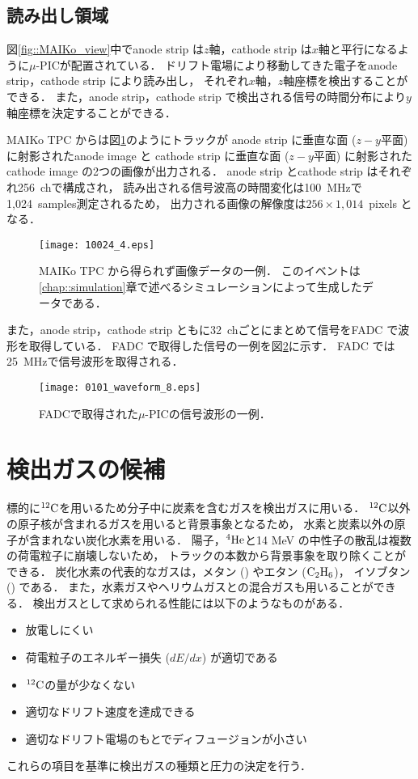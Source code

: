 \documentclass[../master]{subfiles}
\begin{document}
\subsection{読み出し領域}
\label{sec::mu-pic}
図\ref{fig::MAIKo_view}中でanode strip は$z$軸，cathode strip は$x$軸と平行になるように$\mu$-PICが配置されている．
ドリフト電場により移動してきた電子をanode strip，cathode strip により読み出し，
それぞれ$x$軸，$z$軸座標を検出することができる．
また，anode strip，cathode strip で検出される信号の時間分布により$y$軸座標を決定することができる．

MAIKo TPC からは図\ref{fig::track_demo}のようにトラックが
anode strip に垂直な面 ($z-y$平面) に射影されたanode image と
cathode strip に垂直な面 ($z-y$平面) に射影されたcathode image の2つの画像が出力される．
anode strip とcathode strip はそれぞれ256~chで構成され，
読み出される信号波高の時間変化は\SI{100}{\mega\hertz}で1,024~samples測定されるため，
出力される画像の解像度は$256\times1,014$~pixels となる．
\begin{figure}
  \centering
  \texttt{[image: 10024\_4.eps]}
  \caption[MAIKo TPC から得られず画像データの一例．]
          {MAIKo TPC から得られず画像データの一例．
          このイベントは\ref{chap::simulation}章で述べるシミュレーションによって生成したデータである．}
  \label{fig::track_demo}
\end{figure}
また，anode strip，cathode strip ともに32~chごとにまとめて信号をFADC で波形を取得している．
FADC で取得した信号の一例を図\ref{fig::FADC_waveform}に示す．
FADC では\SI{25}{\mega\hertz}で信号波形を取得される．
\begin{figure}
  \centering
  \texttt{[image: 0101\_waveform\_8.eps]}
  \caption{FADCで取得された$\mu$-PICの信号波形の一例．}
  \label{fig::FADC_waveform}
\end{figure}

\section{検出ガスの候補}
\label{sec::detection_gas_candidate}
標的に${}^{12}{\rm C}$を用いるため分子中に炭素を含むガスを検出ガスに用いる．
${}^{12}{\rm C}$以外の原子核が含まれるガスを用いると背景事象となるため，
水素と炭素以外の原子が含まれない炭化水素を用いる．
陽子，${}^{4}{\rm He}$と14 MeV の中性子の散乱は複数の荷電粒子に崩壊しないため，
トラックの本数から背景事象を取り除くことができる．
炭化水素の代表的なガスは，メタン (\Methane) やエタン (${\rm C_{2}H_{6}}$)，
イソブタン (\isoButane) である．
また，水素ガスやヘリウムガスとの混合ガスも用いることができる．
検出ガスとして求められる性能には以下のようなものがある．
\begin{itemize}
\item
  放電しにくい
\item
  荷電粒子のエネルギー損失 ($dE/dx$) が適切である
\item
  ${}^{12}{\rm C}$の量が少なくない
\item
  適切なドリフト速度を達成できる
\item
  適切なドリフト電場のもとでディフュージョンが小さい
\end{itemize}
これらの項目を基準に検出ガスの種類と圧力の決定を行う．
\end{document}
